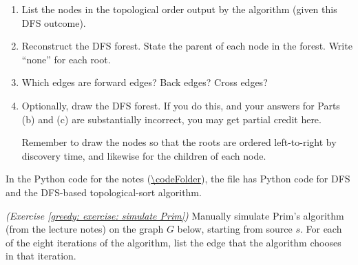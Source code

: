 \documentclass[11pt]{article}
\begin{document}
\begin{enumerate}[label=(\alph*)]
\item List the nodes in the topological order output by the algorithm (given this DFS outcome).
      
\item Reconstruct the DFS forest.  State the parent of each node in the forest.
  Write ``none'' for each root.
      
\item Which edges are forward edges?  Back edges?  Cross edges? 

\item Optionally, draw the DFS forest.
  If you do this, and your answers for Parts (b) and (c)
  are substantially incorrect, you may get partial credit here.

  Remember to draw the nodes so that the roots are ordered left-to-right by discovery time,
  and likewise for the children of each node.
\end{enumerate}

In the Python code for the notes (\url{\codeFolder}),
the file 
has Python code for DFS and the DFS-based topological-sort algorithm.

\continued

\setlength{\ITEMHT}{2.5in}
{\injectEnumerate
}




\newpage
\problem \emph{(Exercise \ref{greedy: exercise: simulate Prim})}
Manually simulate Prim's algorithm (from the lecture notes) on the graph $G$ below, starting from source $s$.
For each of the eight iterations of the algorithm,
list the edge that the algorithm chooses in that iteration.
\end{document}
